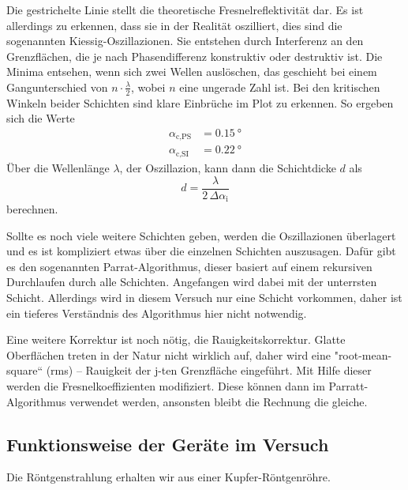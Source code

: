 Die gestrichelte Linie stellt die theoretische Fresnelreflektivität dar.
Es ist allerdings zu erkennen, dass sie in der Realität oszilliert, dies sind die sogenannten Kiessig-Oszillazionen. 
Sie entstehen durch Interferenz an den Grenzflächen, die je nach Phasendifferenz konstruktiv oder destruktiv ist.
Die Minima entsehen, wenn sich zwei Wellen auslöschen, das geschieht bei einem Gangunterschied von $ n \cdot \frac{\lambda}{2}$, wobei $n$ eine ungerade Zahl ist.
Bei den kritischen Winkeln beider Schichten sind klare Einbrüche im Plot zu erkennen. 
So ergeben sich die Werte
\begin{align}
    \alpha _\text{c,PS} &= \SI{0.15}{\degree} \\
    \alpha _\text{c,SI} &= \SI{0.22}{\degree}
\end{align}
Über die Wellenlänge $\lambda$, der Oszillazion, kann dann die Schichtdicke $d$ als 
\begin{equation}
    d = \frac{\lambda}{2 \, \Delta \alpha _\text{i}}
    \label{eq:schicht}
\end{equation}
berechnen.

Sollte es noch viele weitere Schichten geben, werden die Oszillazionen überlagert und es ist kompliziert etwas über die einzelnen Schichten auszusagen.
Dafür gibt es den sogenannten Parrat-Algorithmus, dieser basiert auf einem rekursiven Durchlaufen durch alle Schichten.
Angefangen wird dabei mit der unterrsten Schicht.
Allerdings wird in diesem Versuch nur eine Schicht vorkommen, daher ist ein tieferes Verständnis des Algorithmus hier nicht notwendig.

Eine weitere Korrektur ist noch nötig, die Rauigkeitskorrektur. 
Glatte Oberflächen treten in der Natur nicht wirklich auf, daher wird eine "root-mean-square“ (rms) – Rauigkeit der j-ten Grenzfläche eingeführt.
Mit Hilfe dieser werden die Fresnelkoeffizienten modifiziert.
Diese können dann im Parratt-Algorithmus verwendet werden, ansonsten bleibt die Rechnung die gleiche.

\subsection{Funktionsweise der Geräte im Versuch}
\label{theo3}
 
Die Röntgenstrahlung erhalten wir aus einer Kupfer-Röntgenröhre.